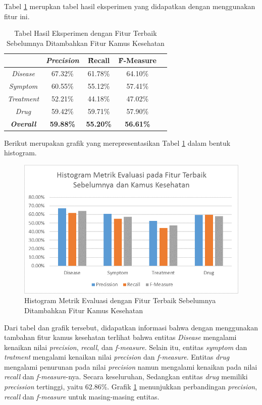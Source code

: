 	Tabel \ref{table:owndict2} merupkan tabel hasil eksperimen yang didapatkan dengan menggunakan fitur ini.
	
	\begin{table}
		\centering
		\caption{Tabel Hasil Eksperimen dengan Fitur Terbaik Sebelumnya Ditambahkan Fitur Kamus Kesehatan}
		\begin{tabular}{|c|c|c|c|c|}
			\hline
			                      & \textit{Precision} & \f{\f{Recall}} & \f{\f{F-Measure}} \\ \hline
			\textit{Disease}      & 67.32\%             & 61.78\%        & 64.10\%           \\ \hline
			\textit{Symptom}      & 60.55\%             & 55.12\%        & 57.41\%           \\ \hline
			\textit{Treatment}    & 52.21\%             & 44.18\%        & 47.02\%           \\ \hline
			\textit{Drug}		  & 59.42\%             & 59.71\%        & 57.90\%           \\ \hline
			\textit{\textbf{Overall}}&\textbf{59.88\%}  & \textbf{55.20\%}& \textbf{56.61\%} \\ \hline
		\end{tabular}
		\label{table:owndict2}
	\end{table}
	
	Berikut merupakan grafik yang merepresentasikan Tabel \ref{table:owndict2} dalam bentuk histogram.
	
	\begin{figure}
		\centering
		\includegraphics[width=0.85\linewidth]{images/histogram2}
		\caption{Histogram Metrik Evaluasi dengan Fitur Terbaik Sebelumnya Ditambahkan Fitur Kamus Kesehatan}
		\label{fig:owndict2}
	\end{figure}

	Dari tabel dan grafik tersebut, didapatkan informasi bahwa dengan menggunakan tambahan fitur kamus kesehatan terlihat bahwa entitas \textit{Disease} mengalami kenaikan nilai \textit{precision}, \textit{recall}, dan \textit{f-measure}. Selain itu, entitas \textit{symptom} dan \textit{tratment} mengalami kenaikan nilai \textit{precision} dan \textit{f-measure}. Entitas \textit{drug} mengalami penurunan pada nilai \textit{precision} namun mengalami kenaikan pada nilai \textit{recall} dan \textit{f-measure}-nya. Secara keseluruhan,  Sedangkan entitas \textit{drug} memiliki \textit{precission} tertinggi, yaitu 62.86\%. Grafik \ref{fig:owndict2} menunjukkan perbandingan \textit{precision}, \textit{recall} dan \textit{f-measure} untuk masing-masing entitas.
	

